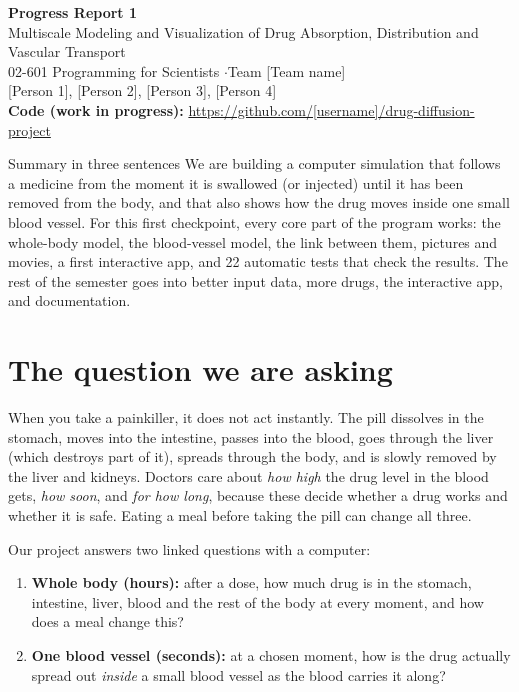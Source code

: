 \documentclass[10.5pt]{article}
\newcommand{\todo}[1]{\textcolor{red!70!black}{#1}}
\begin{document}
\begin{center}
{\Large\bfseries Progress Report 1}\\[3pt]
{\large Multiscale Modeling and Visualization of Drug Absorption, Distribution and Vascular Transport}\\[4pt]
02-601 Programming for Scientists \quad$\cdot$\quad Team \todo{[Team name]}\\
\todo{[Person 1], [Person 2], [Person 3], [Person 4]}\\[3pt]
\textbf{Code (work in progress):} \todo{\url{https://github.com/[username]/drug-diffusion-project}}
\end{center}

\begin{plain}{Summary in three sentences}
We are building a computer simulation that follows a medicine from the moment it is swallowed (or injected)
until it has been removed from the body, and that also shows how the drug moves inside one small blood vessel.
For this first checkpoint, every core part of the program works: the whole-body model, the blood-vessel model,
the link between them, pictures and movies, a first interactive app, and 22 automatic tests that check the results.
The rest of the semester goes into better input data, more drugs, the interactive app, and documentation.
\end{plain}

\section{The question we are asking}
When you take a painkiller, it does not act instantly. The pill dissolves in the stomach, moves into the
intestine, passes into the blood, goes through the liver (which destroys part of it), spreads through the
body, and is slowly removed by the liver and kidneys. Doctors care about \emph{how high} the drug level in
the blood gets, \emph{how soon}, and \emph{for how long}, because these decide whether a drug works and whether
it is safe. Eating a meal before taking the pill can change all three.

Our project answers two linked questions with a computer:
\begin{enumerate}
\item \textbf{Whole body (hours):} after a dose, how much drug is in the stomach, intestine, liver, blood
and the rest of the body at every moment, and how does a meal change this?
\item \textbf{One blood vessel (seconds):} at a chosen moment, how is the drug actually spread out
\emph{inside} a small blood vessel as the blood carries it along?
\end{enumerate}
\end{document}
